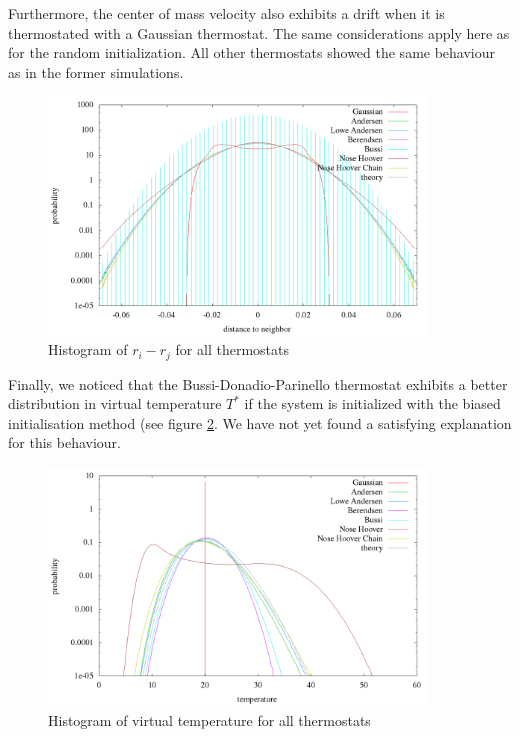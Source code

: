 Furthermore, the center of mass velocity also exhibits a drift when it is thermostated with a Gaussian thermostat. The same considerations apply here as for the random initialization. All other thermostats showed the same behaviour as in the former simulations.     

\begin{figure}[H]
\centering
\includegraphics[width=0.9\textwidth]{./graphics/Histogramm_relPos_one_T=20_p=64.png}
\caption{Histogram of $r_i - r_j$ for all thermostats}
\label{im:relPos_one}
\end{figure} 

Finally, we noticed that the Bussi-Donadio-Parinello thermostat exhibits a better distribution in virtual temperature $T^*$ if the system is initialized with the biased initialisation method (see figure \ref{im:temp_one}. We have not yet found a satisfying explanation for this behaviour. 


\begin{figure}[H]
\centering
\includegraphics[width=0.9\textwidth]{./graphics/Histogramm_tempCol_one_T=20_p=64.png}
\caption{Histogram of virtual temperature for all thermostats}
\label{im:temp_one}
\end{figure}

